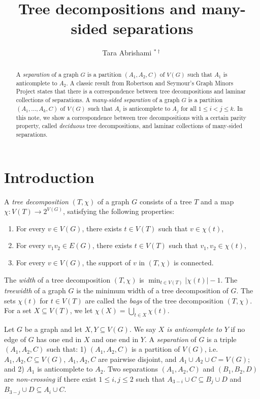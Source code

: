 \documentclass[12pt]{amsart}
\title{Tree decompositions and many-sided separations}
\author{Tara Abrishami $^{\ast \dagger}$}
\begin{document}
\maketitle
\begin{abstract}
    A {\em separation} of a graph $G$ is a partition $(A_1, A_2, C)$ of $V(G)$ such that $A_1$ is anticomplete to $A_2$. A classic result from Robertson and Seymour's Graph Minors Project states that there is a correspondence between tree decompositions and laminar collections of separations. A {\em many-sided separation} of a graph $G$ is a partition $(A_1, \hdots, A_k, C)$ of $V(G)$ such that $A_i$ is anticomplete to $A_j$ for all $1 \leq i < j \leq k$. In this note, we show a correspondence between tree decompositions with a certain parity property, called {\em deciduous} tree decompositions, and laminar collections of many-sided separations. 
\end{abstract}
\section{Introduction}

A {\em tree decomposition} $(T, \chi)$ of a graph $G$ consists of a tree $T$ and a map $\chi: V(T) \to 2^{V(G)}$, satisfying the following properties: 
\begin{enumerate}[\hspace{1.5em} (i)]
    \item For every $v \in V(G)$, there exists $t \in V(T)$ such that $v \in \chi(t)$, 
    \item For every $v_1v_2 \in E(G)$, there exists $t \in V(T)$ such that $v_1, v_2 \in \chi(t)$, 
    \item For every $v \in V(G)$, the support of $v$ in $(T, \chi)$ is connected. 
\end{enumerate}

The {\em width} of a tree decomposition $(T, \chi)$ is $\min_{t \in V(T)} |\chi(t)| - 1$. The {\em treewidth} of a graph $G$ is the minimum width of a tree decomposition of $G$. The sets $\chi(t)$ for $t \in V(T)$ are called the {\em bags} of the tree decomposition $(T, \chi)$. For a set $X \subseteq V(T)$, we let $\chi(X) = \bigcup_{t \in X} \chi(t)$. 

Let $G$ be a graph and let $X, Y \subseteq V(G)$. We say {\em $X$ is anticomplete to $Y$} if no edge of $G$ has one end in $X$ and one end in $Y$. A {\em separation} of $G$ is a triple $(A_1, A_2, C)$ such that: 1) $(A_1, A_2, C)$ is a partition of $V(G)$, i.e. $A_1, A_2, C \subseteq V(G)$, $A_1, A_2, C$ are pairwise disjoint, and $A_1 \cup A_2 \cup C = V(G)$; and 2) $A_1$ is anticomplete to $A_2$. Two separations $(A_1, A_2, C)$ and $(B_1, B_2, D)$ are {\em non-crossing} if there exist $1 \leq i, j \leq 2$ such that $A_{3-i} \cup C \subseteq B_{j} \cup D$ and $B_{3-j} \cup D \subseteq A_i \cup C$. 
\end{document}
